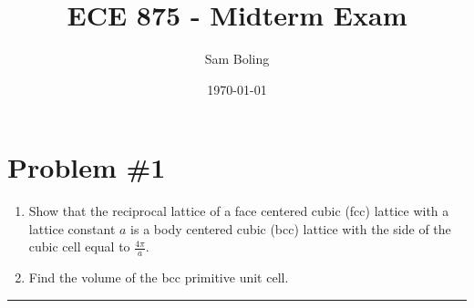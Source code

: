 \documentclass{article}
\title{ECE 875 - Midterm Exam}
\author{Sam Boling}
\date{\today}
\newcommand{\horline}
           {\begin{center}
              \noindent\rule{8cm}{0.4pt}
            \end{center}}
\begin{document}
\maketitle

\section*{Problem \#1}
\begin{enumerate}
  \item{Show that the reciprocal lattice of a face centered cubic
        (fcc) lattice with a lattice constant $a$ is a body
        centered cubic (bcc) lattice with the side of the cubic
        cell equal to $\frac{4 \pi}{a}$.
       }
  \item{Find the volume of the bcc primitive unit cell.}
\end{enumerate}
\horline
\end{document}

